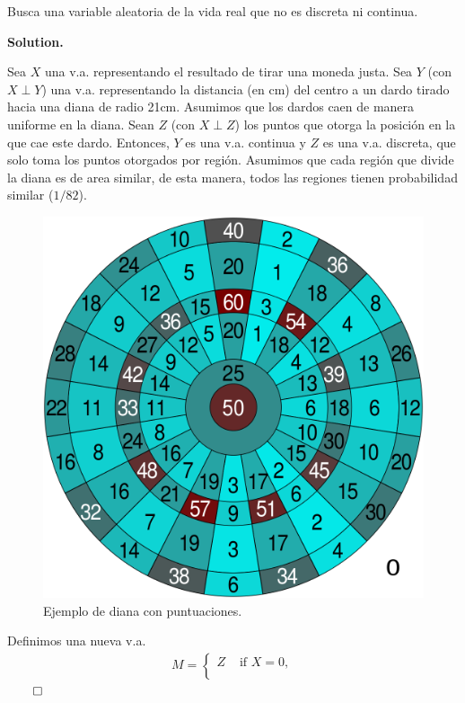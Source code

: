 \documentclass{article}
\theoremstyle{problemstyle}
\newenvironment{solution}{%
  \begin{mdframed}[linewidth=0.8pt,linecolor=Gray,backgroundcolor=Gray!5,roundcorner=5pt]%
  \noindent\textbf{Solution.}%
}{%
\hfill $ \qed $ 
  \end{mdframed}%
}
\begin{document}
\begin{problem}
Busca una variable aleatoria de la vida real que no es discreta ni continua.
\end{problem}

\begin{solution}
	Sea $ X $ una v.a. representando el resultado de tirar una moneda justa. Sea $ Y $ (con $ X\perp Y $) una v.a. representando la distancia (en cm) del centro a un dardo tirado hacia una diana de radio 21cm. Asumimos que los dardos caen de manera uniforme en la diana. Sean $ Z $ (con $ X\perp Z $) los puntos que otorga la posici\'on en la que cae este dardo. Entonces, $ Y $ es una v.a. continua y $ Z $ es una v.a. discreta, que solo toma los puntos otorgados por regi\'on. Asumimos que cada regi\'on que divide la diana es de area similar, de esta manera, todos las regiones tienen probabilidad similar ($ 1/82 $).
	\begin{figure}[H]
		\centering
		\includegraphics[scale=0.1]{images/Dartboard_heatmap.png}
		\caption{Ejemplo de diana con puntuaciones.}
	\end{figure}
	Definimos una nueva v.a.
	\begin{align*}
		M = \begin{cases}
			    Z & \text{ if }X = 0, \\

\end{cases}
\end{align*}
\end{solution}
\end{document}
